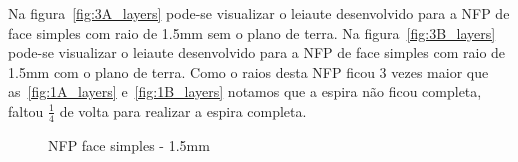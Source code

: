 Na figura~\ref{fig:3A_layers} pode-se visualizar o leiaute desenvolvido para a NFP de face simples com raio de 1.5mm sem o plano de terra. Na figura~\ref{fig:3B_layers} pode-se visualizar o leiaute desenvolvido para a NFP de face simples com raio de 1.5mm com o plano de terra. Como o raios desta NFP ficou 3 vezes maior que as~\ref{fig:1A_layers} e~\ref{fig:1B_layers} notamos que a espira não ficou completa, faltou $\frac{1}{4}$ de volta para realizar a espira completa.
\begin{figure}[htb!]
	\centering
 	\caption{NFP face simples - 1.5mm}
\end{figure}


